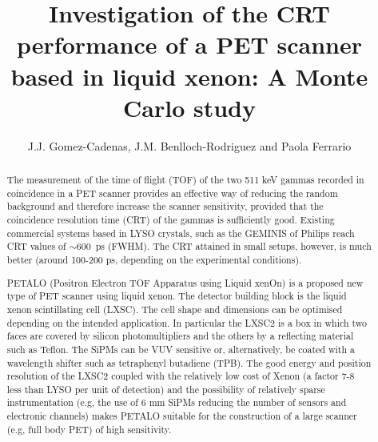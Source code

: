 \documentclass[review]{elsarticle}
\begin{document}
\begin{frontmatter}

\title{Investigation of the CRT performance of a PET scanner based in liquid xenon: A Monte Carlo study}


\author{J.J. Gomez-Cadenas, J.M. Benlloch-Rodriguez and Paola Ferrario}
\address{IFIC (U. Valencia/CSIC)}

%
%

\begin{abstract}
The measurement of the time of flight (TOF) of the two 511 keV gammas recorded in coincidence in a PET scanner provides an effective way of reducing the random background and therefore increase the scanner sensitivity, provided that the coincidence resolution time (CRT) of the gammas is sufficiently good. Existing commercial systems based in LYSO crystals, such as the GEMINIS of Philips reach CRT values of 
$\sim 600$~ps (FWHM). The CRT attained in small setups, however, is much better (around 100-200 ps, depending on the experimental conditions). 

PETALO (Positron Electron TOF Apparatus using Liquid xenOn) is a proposed new type of PET scanner using liquid xenon. The detector building block is the liquid xenon scintillating cell (LXSC). The cell shape and dimensions can be optimised depending on the intended application. In particular the LXSC2 is a box in which two faces are covered by silicon photomultipliers and the others by a reflecting material such as Teflon. The SiPMs can be VUV sensitive or, alternatively, be coated with a wavelength shifter such as tetraphenyl butadiene (TPB). The good energy and position resolution of the LXSC2 coupled with the relatively low cost of Xenon (a factor 7-8 less than LYSO per unit of detection) and the possibility of relatively sparse instrumentation (e.g, the use of 6 mm SiPMs reducing the number of sensors and electronic channels) makes PETALO suitable for the construction of a large scanner (e.g, full body PET) of high sensitivity.   


\end{abstract}
\end{frontmatter}
\end{document}
